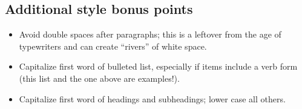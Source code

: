\subsection{Additional style bonus points}

\begin{itemize}
\item
  Avoid double spaces after paragraphs; this is a leftover from the age
  of typewriters and can create ``rivers'' of white space.
\item
  Capitalize first word of bulleted list, especially if items include a
  verb form (this list and the one above are examples!).
\item
  Capitalize first word of headings and subheadings; lower case all
  others.
\end{itemize}

~
